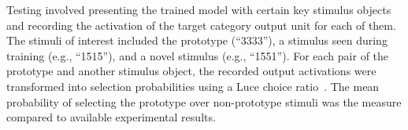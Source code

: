 
Testing involved presenting the trained model with certain key stimulus objects and recording the activation of the target category output unit for each of them. The stimuli of interest included the prototype (``3333''), a stimulus seen during training (e.g., ``1515''), and a novel stimulus (e.g., ``1551''). For each pair of the prototype and another stimulus object, the recorded output activations were transformed into selection probabilities using a Luce choice ratio~\cite{LuceRD:1963:Ratio}. The mean probability of selecting the prototype over non-prototype stimuli was the measure compared to available experimental results.


